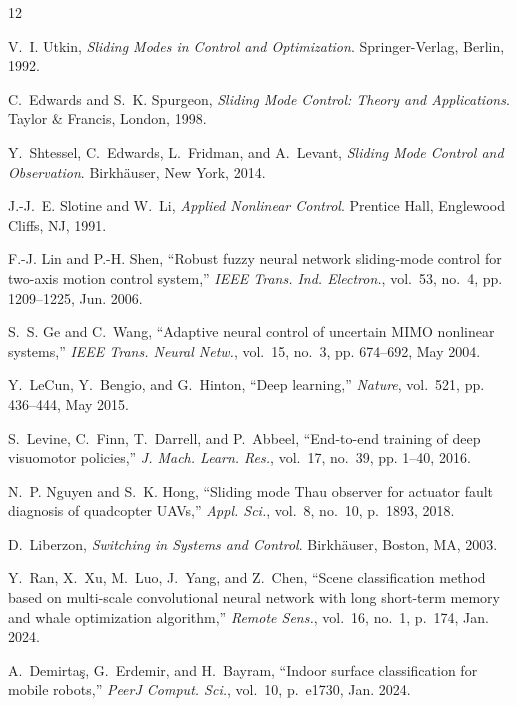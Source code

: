 \documentclass[11pt,a4paper]{article}
\begin{document}
\begin{thebibliography}{12}

V.~I. Utkin, \emph{Sliding Modes in Control and Optimization}. Springer-Verlag, Berlin, 1992.

C.~Edwards and S.~K. Spurgeon, \emph{Sliding Mode Control: Theory and Applications}.
Taylor \& Francis, London, 1998.

Y.~Shtessel, C.~Edwards, L.~Fridman, and A.~Levant, \emph{Sliding Mode Control and
Observation}. Birkh\"auser, New York, 2014.

J.-J.~E. Slotine and W.~Li, \emph{Applied Nonlinear Control}. Prentice Hall,
Englewood Cliffs, NJ, 1991.

F.-J. Lin and P.-H. Shen, ``Robust fuzzy neural network sliding-mode control for two-axis
motion control system,'' \emph{IEEE Trans. Ind. Electron.}, vol.~53, no.~4,
pp. 1209--1225, Jun. 2006.

S.~S. Ge and C.~Wang, ``Adaptive neural control of uncertain MIMO nonlinear systems,''
\emph{IEEE Trans. Neural Netw.}, vol.~15, no.~3, pp. 674--692, May 2004.

Y.~LeCun, Y.~Bengio, and G.~Hinton, ``Deep learning,'' \emph{Nature}, vol.~521,
pp. 436--444, May 2015.

S.~Levine, C.~Finn, T.~Darrell, and P.~Abbeel, ``End-to-end training of deep visuomotor
policies,'' \emph{J. Mach. Learn. Res.}, vol.~17, no.~39, pp. 1--40, 2016.

N.~P. Nguyen and S.~K. Hong, ``Sliding mode Thau observer for actuator fault diagnosis of
quadcopter UAVs,'' \emph{Appl. Sci.}, vol.~8, no.~10, p.~1893, 2018.

D.~Liberzon, \emph{Switching in Systems and Control}. Birkh\"auser, Boston, MA, 2003.

Y.~Ran, X.~Xu, M.~Luo, J.~Yang, and Z.~Chen, ``Scene classification method based on
multi-scale convolutional neural network with long short-term memory and whale
optimization algorithm,'' \emph{Remote Sens.}, vol.~16, no.~1, p.~174, Jan. 2024.

A.~Demirta\c{s}, G.~Erdemir, and H.~Bayram, ``Indoor surface classification for mobile
robots,'' \emph{PeerJ Comput. Sci.}, vol.~10, p.~e1730, Jan. 2024.

\end{thebibliography}
\end{document}
